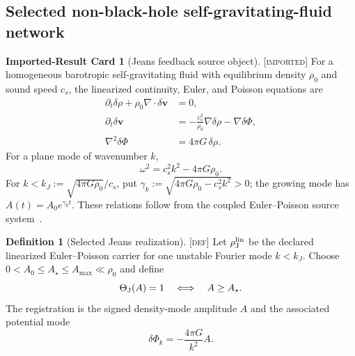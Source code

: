 \documentclass[11pt]{article}
\newcommand{\Defn}{\textsc{[def]}}
\newcommand{\Imp}{\textsc{[imported]}}
\theoremstyle{definition}
\newtheorem{sdefinition}{Definition}
\newtheorem{scard}{Imported-Result Card}
\begin{document}
\subsection{Selected non-black-hole self-gravitating-fluid network}
\label{supp:jeans-realization}

\begin{scard}[Jeans feedback source object]
\label{card:jeans-feedback-source}
\Imp{} For a homogeneous barotropic self-gravitating fluid with equilibrium
density $\rho_0$ and sound speed $c_s$, the linearized continuity, Euler, and
Poisson equations are
\begin{align}
\partial_t\delta\rho+\rho_0\nabla\!\cdot\delta\mathbf v&=0,
\label{eq:jeans-continuity}\\
\partial_t\delta\mathbf v&=-\frac{c_s^2}{\rho_0}\nabla\delta\rho
-\nabla\delta\Phi,
\label{eq:jeans-euler}\\
\nabla^2\delta\Phi&=4\pi G\,\delta\rho.
\label{eq:jeans-poisson}
\end{align}
For a plane mode of wavenumber $k$,
\begin{equation}
\omega^2=c_s^2k^2-4\pi G\rho_0.
\label{eq:jeans-dispersion}
\end{equation}
For $k<k_J:=\sqrt{4\pi G\rho_0}/c_s$, put
$\gamma_k:=\sqrt{4\pi G\rho_0-c_s^2k^2}>0$; the growing mode has
$A(t)=A_0e^{\gamma_kt}$.  These relations follow from the coupled
Euler--Poisson source system~\cite{S_Jeans1902,S_BinneyTremaine2008,S_Chavanis2010}.
\end{scard}

\begin{sdefinition}[Selected Jeans realization]
\label{def:selected-jeans-realization}
\Defn{} Let $\rho_{\rm J}^{\rm lin}$ be the declared linearized Euler--Poisson
carrier for one unstable Fourier mode $k<k_J$.  Choose
$0<A_0\le A_\star\le A_{\max}\ll\rho_0$ and define
\begin{equation}
\Theta_{\rm J}(A)=1\quad\Longleftrightarrow\quad A\ge A_\star.
\label{eq:jeans-target-predicate}
\end{equation}
The registration is the signed density-mode amplitude $A$ and the associated
potential mode
\begin{equation}
\delta\Phi_k=-\frac{4\pi G}{k^2}A.
\label{eq:jeans-registration}
\end{equation}
\end{sdefinition}
\end{document}
